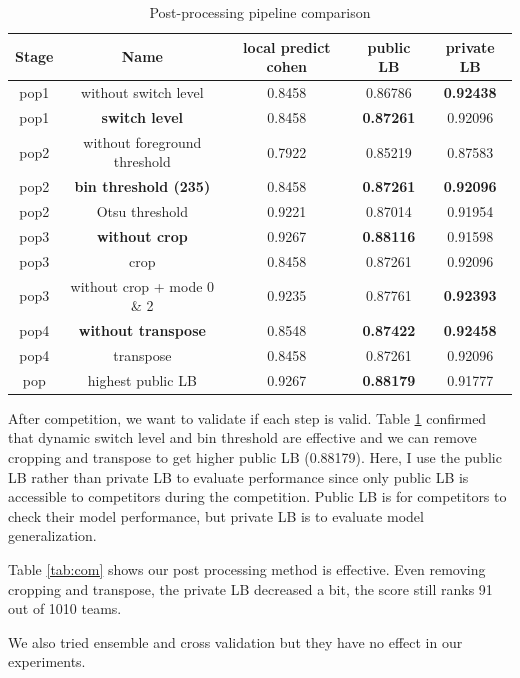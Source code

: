 \documentclass{article}
\begin{document}
\begin{table}[!htb]
\centering
\begin{tabular}{c | c | c | c | c}
\toprule
Stage & Name & local predict cohen & public LB & private LB \\
\toprule
pop1 & without switch level & 0.8458 & 0.86786 & \textbf{0.92438} \\
pop1 & \textbf{switch level} & 0.8458 & \textbf{0.87261} & 0.92096 \\
\hline
pop2 & without foreground threshold & 0.7922 & 0.85219 & 0.87583 \\
pop2 & \textbf{bin threshold (235)} & 0.8458 & \textbf{0.87261} & \textbf{0.92096} \\
pop2 & Otsu threshold & 0.9221 & 0.87014 & 0.91954 \\
\hline
pop3 & \textbf{without crop} & 0.9267 & \textbf{0.88116} & 0.91598\\
pop3 & crop  & 0.8458 & 0.87261 & 0.92096 \\
pop3 & without crop + mode 0 \& 2 & 0.9235 & 0.87761 & \textbf{0.92393} \\
\hline
pop4 & \textbf{without transpose} & 0.8548 & \textbf{0.87422} & \textbf{0.92458} \\
pop4 & transpose  & 0.8458 & 0.87261 & 0.92096 \\
\hline
pop & highest public LB  & 0.9267 & \textbf{0.88179} & 0.91777 \\
\bottomrule
\end{tabular}
\caption{Post-processing pipeline comparison}
\label{tab:pos}
\end{table}


After competition, we want to validate if each step is valid. Table \ref{tab:pos} confirmed that dynamic switch level and bin threshold are effective and we can remove cropping and transpose to get higher public LB (0.88179). Here, I use the public LB rather than private LB to evaluate performance since only public LB is accessible to competitors during the competition. Public LB is for competitors to check their model performance, but private LB is to evaluate model generalization.


Table \ref{tab:com} shows our post processing method is effective. Even removing cropping and transpose, the private LB decreased a bit, the score still ranks 91 out of 1010 teams. 

We also tried ensemble and cross validation but they have no effect in our experiments.
\end{document}
